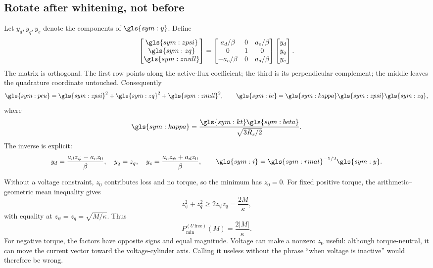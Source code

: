 \subsection{Rotate after whitening, not before}

Let \(y_d,y_q,y_e\) denote the components of \(\gls{sym:y}\). Define
\begin{equation}
 \begin{bmatrix}\gls{sym:zpsi}\\\gls{sym:zq}\\\gls{sym:znull}\end{bmatrix}
 =\begin{bmatrix}
 a_d/\beta&0&a_e/\beta\\
 0&1&0\\
 -a_e/\beta&0&a_d/\beta
 \end{bmatrix}
 \begin{bmatrix}y_d\\y_q\\y_e\end{bmatrix}.
 \label{eq:torque-rotation}
\end{equation}
The matrix is orthogonal. The first row points along the active-flux
coefficient; the third is its perpendicular complement; the middle leaves the
quadrature coordinate untouched. Consequently
\begin{equation}
 \gls{sym:pcu}=\gls{sym:zpsi}^2+\gls{sym:zq}^2+\gls{sym:znull}^2,
 \qquad
 \gls{sym:te}=\gls{sym:kappa}\gls{sym:zpsi}\gls{sym:zq},
 \label{eq:canonical-product}
\end{equation}
where
\begin{equation}
 \gls{sym:kappa}=\frac{\gls{sym:kt}\gls{sym:beta}}{\sqrt{3R_s/2}}.
 \label{eq:kappa}
\end{equation}
The inverse is explicit:
\begin{equation}
 y_d=\frac{a_dz_\psi-a_ez_0}{\beta},\quad y_q=z_q,\quad
 y_e=\frac{a_ez_\psi+a_dz_0}{\beta},\qquad
 \gls{sym:i}=\gls{sym:rmat}^{-1/2}\gls{sym:y}.
 \label{eq:torque-inverse}
\end{equation}

Without a voltage constraint, \(z_0\) contributes loss and no torque, so the
minimum has \(z_0=0\). For fixed positive torque, the arithmetic--geometric
mean inequality gives
\begin{equation}
 z_\psi^2+z_q^2\geq2z_\psi z_q=\frac{2M}{\kappa},
\end{equation}
with equality at \(z_\psi=z_q=\sqrt{M/\kappa}\). Thus
\begin{equation}
 P_{\min}^{(U\,\mathrm{free})}(M)=\frac{2|M|}{\kappa}.
 \label{eq:unconstrained-minloss}
\end{equation}
For negative torque, the factors have opposite signs and equal magnitude.
Voltage can make a nonzero \(z_0\) useful: although torque-neutral, it can move
the current vector toward the voltage-cylinder axis. Calling it useless
without the phrase ``when voltage is inactive'' would therefore be wrong.


